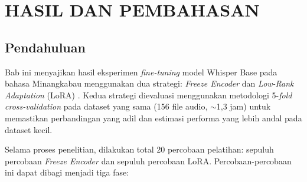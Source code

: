 \newpage
\chapter{HASIL DAN PEMBAHASAN} \label{Bab IV}

\section{Pendahuluan}

Bab ini menyajikan hasil eksperimen \textit{fine-tuning} model Whisper Base \cite{radford2023whisper} pada bahasa Minangkabau menggunakan dua strategi: \textit{Freeze Encoder} dan \textit{Low-Rank Adaptation} (LoRA) \cite{hu2022lora}. Kedua strategi dievaluasi menggunakan metodologi 5-\textit{fold cross-validation} \cite{kohavi1995crossvalidation} pada dataset yang sama (156 file audio, $\sim$1,3 jam) untuk memastikan perbandingan yang adil dan estimasi performa yang lebih andal pada dataset kecil.

Selama proses penelitian, dilakukan total 20 percobaan pelatihan: sepuluh percobaan \textit{Freeze Encoder} dan sepuluh percobaan LoRA. Percobaan-percobaan ini dapat dibagi menjadi tiga fase:

